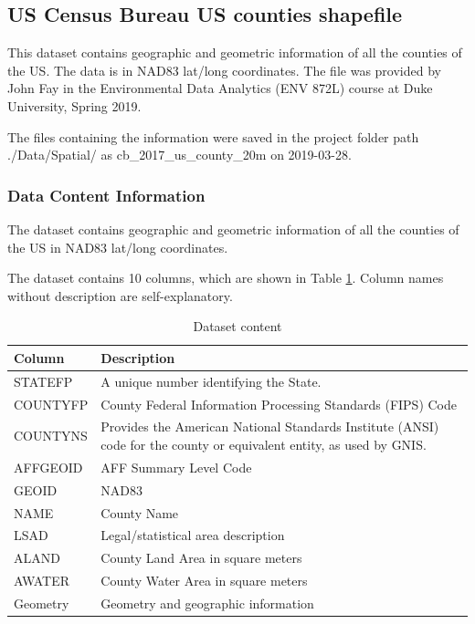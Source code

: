 \documentclass[12pt,]{article}
\begin{document}
\subsection{US Census Bureau US counties
shapefile}\label{us-census-bureau-us-counties-shapefile}

This dataset contains geographic and geometric information of all the
counties of the US. The data is in NAD83 lat/long coordinates. The file
was provided by John Fay in the Environmental Data Analytics (ENV 872L)
course at Duke University, Spring 2019.

The files containing the information were saved in the project folder
path ./Data/Spatial/ as cb\_2017\_us\_county\_20m on 2019-03-28.

\subsubsection{Data Content
Information}\label{data-content-information-3}

The dataset contains geographic and geometric information of all the
counties of the US in NAD83 lat/long coordinates.

The dataset contains 10 columns, which are shown in Table
\ref{tab:tab8}. Column names without description are self-explanatory.

\begin{table}[ht]
\centering
\begin{tabular}{p{2.5in}p{3.5in}}
  \hline
Column & Description \\ 
  \hline
STATEFP & A unique number identifying the State. \\ 
  COUNTYFP & County Federal Information Processing Standards (FIPS) Code \\ 
  COUNTYNS & Provides the American National Standards Institute (ANSI) code for the county or equivalent entity, as used by GNIS. \\ 
  AFFGEOID & AFF Summary Level Code \\ 
  GEOID & NAD83 \\ 
  NAME & County Name \\ 
  LSAD & Legal/statistical area description \\ 
  ALAND & County Land Area in square meters \\ 
  AWATER & County Water Area in square meters \\ 
  Geometry & Geometry and geographic information \\ 
   \hline
\end{tabular}
\caption{Dataset content} 
\label{tab:tab8}
\end{table}
\end{document}
